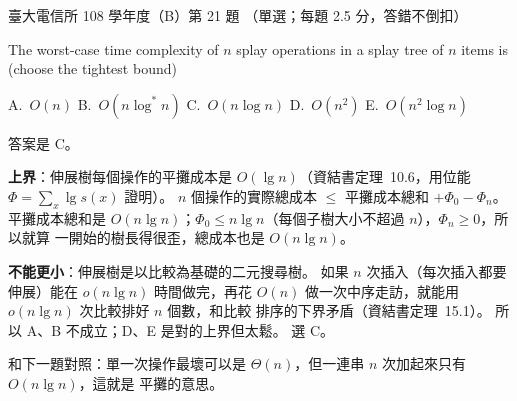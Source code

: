 \begin{pastexam}[label={px:ntu-108-comm-dsab-21}]{臺大電信所 108 學年度（B）第 21 題}
（單選；每題 2.5 分，答錯不倒扣）

The worst-case time complexity of $n$ splay operations in a splay tree of $n$ items is (choose the
tightest bound)

A.~$O(n)$ \qquad B.~$O(n\log^* n)$ \qquad C.~$O(n\log n)$ \qquad D.~$O(n^2)$ \qquad
E.~$O(n^2\log n)$
\end{pastexam}

\begin{pastsoln}
答案是 C。

\textbf{上界}：伸展樹每個操作的平攤成本是 $O(\lg n)$（資結書定理~10.6，用位能
$\Phi = \sum_x \lg s(x)$ 證明）。 $n$ 個操作的實際總成本 $\le$ 平攤成本總和 $+ \Phi_0 - \Phi_n$。
平攤成本總和是 $O(n \lg n)$；$\Phi_0 \le n \lg n$（每個子樹大小不超過 $n$），$\Phi_n \ge 0$，所以就算
一開始的樹長得很歪，總成本也是 $O(n \lg n)$。

\textbf{不能更小}：伸展樹是以比較為基礎的二元搜尋樹。 如果 $n$ 次插入（每次插入都要伸展）能在
$o(n \lg n)$ 時間做完，再花 $O(n)$ 做一次中序走訪，就能用 $o(n \lg n)$ 次比較排好 $n$ 個數，和比較
排序的下界矛盾（資結書定理~15.1）。 所以 A、B 不成立；D、E 是對的上界但太鬆。 選 C。

和下一題對照：單一次操作最壞可以是 $\Theta(n)$，但一連串 $n$ 次加起來只有 $O(n \lg n)$，這就是
平攤的意思。
\end{pastsoln}
